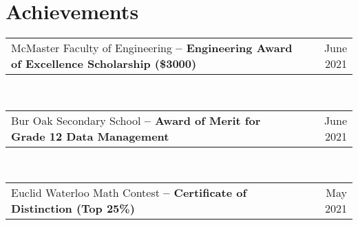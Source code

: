 \documentclass[letterpaper,11pt]{article}
\makeatletter
\newcommand{\resumeDatedList}[2]{
    \vspace{-2pt}\item
    \begin{tabular*}{0.97\textwidth}[t]{l@{\extracolsep{\fill}}r}
        #1 & #2 \\
    \end{tabular*}
}
\newcommand{\resumeListStart}{\begin{itemize}[itemindent=-0.33in,leftmargin=0.48in, label={}]}
\newcommand{\resumeListEnd}{\end{itemize}}
\makeatother
\begin{document}
%
\section{Achievements}
    \resumeListStart\small{
        \resumeDatedList{McMaster Faculty of Engineering \textbf{-- Engineering Award of Excellence Scholarship (\$3000)}}{June 2021} \\
        \resumeDatedList{Bur Oak Secondary School \textbf{-- Award of Merit for Grade 12 Data Management}}{June 2021} \\
        \resumeDatedList{Euclid Waterloo Math Contest \textbf{-- Certificate of Distinction (Top 25\%)}}{May 2021} \\
    } \resumeListEnd

\end{document}
